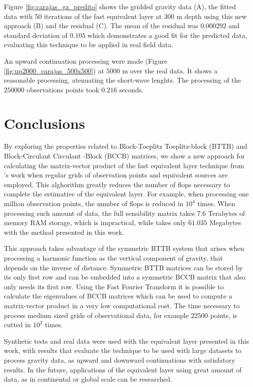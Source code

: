 \documentclass[paper]{geophysics}
\begin{document}
Figure \ref{fig:carajas_gz_predito} shows the gridded gravity data (A), the fitted data with 50 iterations of the fast equivalent layer at $300$ m depth using this new approach (B) and the residual (C). The mean of the residual was $0.000292$ and standard deviation of $0.105$ which demonstrates a good fit for the predicted data, evaluating this technique to be applied in real field data.

An upward continuation processing were made (Figure \ref{fig:up2000_carajas_500x500}) at $5000$ m over the real data. It shows a reasonable processing, atenuating the short-wave lenghts. The processing of the $250000$ observations points took $0.216$ seconds.

\section{Conclusions}
By exploring the properties related to Block-Toeplitz Toeplitz-block (BTTB) and Block-Circulant Circulant -Block (BCCB) matrices, we show a new approach for calculating the matrix-vector product of the fast equivalent layer technique from \cite{siqueira2017fast}'s work when regular grids of observation points and equivalent sources are employed. This alghorithm greatly reduces the number of flops necessary to complete the estimative of the equivalent layer. For example, when processing one million observation points, the number of flops is reduced in $10^4$ times. When processing such amount of data, the full sensibility matrix takes $7.6$ Terabytes of memory RAM storage, which is impractical, while takes only $61.035$ Megabytes with the method presented in this work.

This approach takes advantage of the symmetric BTTB system that arises when processing a harmonic function as the vertical component of gravity, that depends on the inverse of distance. Symmetric BTTB matrices can be stored by its only first row and can be embedded into a symmetric BCCB matrix that also only needs its first row. Using the Fast Fourier Transform it is possible to calculate the eigenvalues of BCCB matrices which can be used to compute a matrix-vector product in a very low computational cost. The time necessary to process medium sized grids of observational data, for example $22500$ points, is cutted in $10^2$ times.

Synthetic tests and real data were used with the equivalent layer presented in this work, with results that evaluate the technique to be used with large datasets to process gravity data, as upward and downward continuations with satisfatory results. In the future, applications of the equivalent layer using great amount of data, as in continental or global scale can be researched.
\newpage
\end{document}
